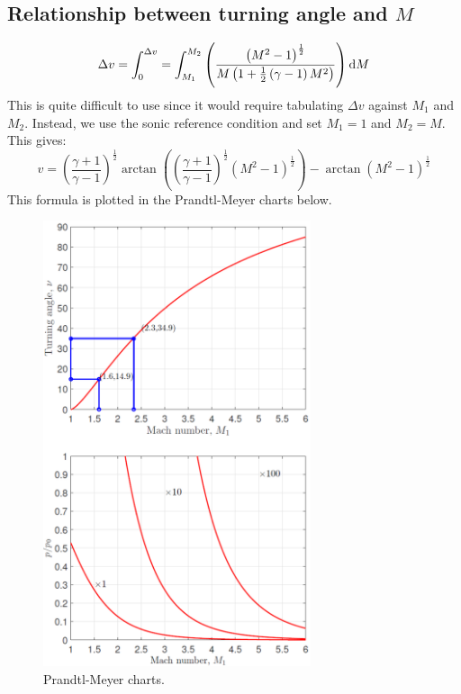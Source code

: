 \documentclass[class=report, crop=false, 12pt,a4paper]{standalone}
\begin{document}
\subsection{Relationship between turning angle and $M$}
\begin{equation}
    \Delta v = \int_0^{\Delta v} = \int_{M_1}^{M_2} \left(\frac{\left(M^2 - 1\right)^{\frac{1}{2}}}{M \left(1 + \frac{1}{2}\left(\gamma - 1\right)M^2\right)}\right)\dif M
\end{equation}
This is quite difficult to use since it would require tabulating $\Delta v$ against $M_1$ and $M_2$. Instead, we use the sonic reference condition and set $M_1 = 1$ and $M_2 = M$. This gives:
\begin{equation}
    v = \left(\frac{\gamma + 1}{\gamma -1}\right)^{\frac{1}{2}}\arctan\left(\left(\frac{\gamma + 1}{\gamma - 1}\right)^{\frac{1}{2}}\left(M^2 - 1\right)^{\frac{1}{2}}\right)-\arctan\left(M^2 - 1\right)^{\frac{1}{2}}
\end{equation}
This formula is plotted in the Prandtl-Meyer charts below.
\begin{figure}[H]
    \centering
    \includegraphics[width = 0.7\textwidth]{../img/diagram25.png}
    \caption{Prandtl-Meyer charts.}
\end{figure}
\end{document}
